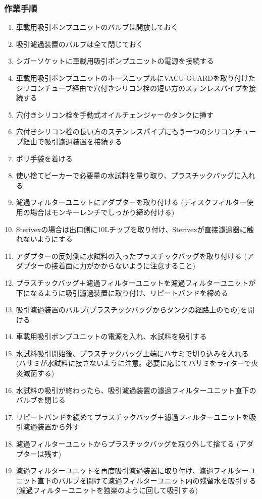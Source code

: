 \documentclass[titlepage,10pt,a4paper,uplatex]{jsbook}
\begin{document}
\subsubsection{作業手順}
\begin{enumerate}
\item 車載用吸引ポンプユニットのバルブは開放しておく
\item 吸引濾過装置のバルブは全て閉じておく
\item シガーソケットに車載用吸引ポンプユニットの電源を接続する
\item 車載用吸引ポンプユニットのホースニップルにVACU-GUARDを取り付けたシリコンチューブ経由で穴付きシリコン栓の短い方のステンレスパイプを接続する
\item 穴付きシリコン栓を手動式オイルチェンジャーのタンクに挿す
\item 穴付きシリコン栓の長い方のステンレスパイプにもう一つのシリコンチューブ経由で吸引濾過装置を接続する
\item ポリ手袋を着ける
\item 使い捨てビーカーで必要量の水試料を量り取り、プラスチックバッグに入れる
\item 濾過フィルターユニットにアダプターを取り付ける (ディスクフィルター使用の場合はモンキーレンチでしっかり締め付ける)
\item Sterivexの場合は出口側に10{\textmu}Lチップを取り付け、Sterivexが直接濾過器に触れないようにする
\item アダプターの反対側に水試料の入ったプラスチックバッグを取り付ける (アダプターの接着面に力がかからないように注意すること)
\item プラスチックバッグ＋濾過フィルターユニットを濾過フィルターユニットが下になるように吸引濾過装置に取り付け、リピートバンドを締める
\item 吸引濾過装置のバルブ(プラスチックバッグからタンクの経路上のもの)を開ける
\item 車載用吸引ポンプユニットの電源を入れ、水試料を吸引する
\item 水試料吸引開始後、プラスチックバッグ上端にハサミで切り込みを入れる (ハサミが水試料に接さないように注意。必要に応じてハサミをライターで火炎滅菌する)
\item 水試料の吸引が終わったら、吸引濾過装置の濾過フィルターユニット直下のバルブを閉じる
\item リピートバンドを緩めてプラスチックバッグ＋濾過フィルターユニットを吸引濾過装置から外す
\item 濾過フィルターユニットからプラスチックバッグを取り外して捨てる (アダプターは残す)
\item 濾過フィルターユニットを再度吸引濾過装置に取り付け、濾過フィルターユニット直下のバルブを開けて濾過フィルターユニット内の残留水を吸引する (濾過フィルターユニットを独楽のように回して吸引する)

\end{enumerate}
\end{document}
